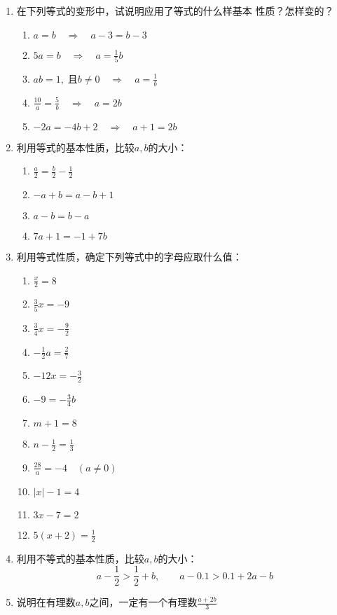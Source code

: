 \begin{enumerate}
	\item  在下列等式的变形中，试说明应用了等式的什么样基本
	性质？怎样变的？
	\begin{enumerate}
		\item $a=b\quad \Rightarrow\quad a-3=b-3$
		\item $ 5a=b  \quad \Rightarrow\quad  a=\frac{1}{5}b $
		\item  $ ab=1,\; \text{且}b\ne 0  \quad \Rightarrow\quad  a=\frac{1}{b} $
		\item  $ \frac{10}{a}=\frac{5}{b}  \quad \Rightarrow\quad a=2b  $
		\item $ -2a=-4b+2  \quad \Rightarrow\quad  a+1=2b $
	\end{enumerate}
	
	\item 利用等式的基本性质，比较$a,b$的大小：
	\begin{multicols}{2}
		\begin{enumerate}
			\item $\frac{a}{2}=\frac{b}{2}-\frac{1}{2}$
			\item $-a+b=a-b+1$
			\item $a-b=b-a$
			\item $7a+1=-1+7b$
		\end{enumerate}
	\end{multicols}
	
	\item 利用等式性质，确定下列等式中的字母应取什么值：
	\begin{multicols}{2}
		\begin{enumerate}
			\item $\frac{x}{2}=8 $
			\item $\frac{3}{5}x=-9 $
			\item $\frac{3}{4}x=-\frac{9}{2} $
			\item $-\frac{1}{2}a=\frac{2}{7} $
			\item $-12x=-\frac{3}{2} $
			\item $-9=-\frac{3}{4}b $
			\item $m+1=8 $
			\item $n-\frac{1}{2}=\frac{1}{3} $
			\item $\frac{28}{a}=-4\quad (a\ne 0) $
			\item $|x|-1=4 $
			\item $3x-7=2 $
			\item $5(x+2)=\frac{1}{2} $
		\end{enumerate}
	\end{multicols}
	
	\item 利用不等式的基本性质，比较$a, b$的大小：
	\[a-\frac{1}{2}>\frac{1}{2}+b,\qquad a-0.1>0.1+2a-b \]
	
	\item 说明在有理数$a, b$之间，一定有一个有理数$\frac{a+2b}{3}$
\end{enumerate}

